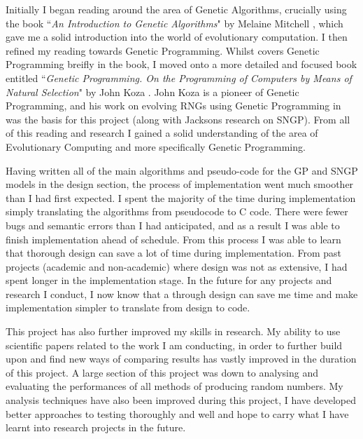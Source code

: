 \documentclass[a4paper,10.5pt]{article}
\begin{document}
Initially I began reading around the area of Genetic Algorithms, crucially using the book ``\emph{An Introduction to Genetic Algorithms}" by Melaine Mitchell \cite{mitchell}, which gave me a solid introduction into the world of evolutionary computation. I then refined my reading towards Genetic Programming. Whilst \cite{mitchell} covers Genetic Programming breifly in the book, I moved onto a more detailed and focused book entitled ``\emph{Genetic Programming. On the Programming of Computers by Means of Natural Selection}" by John Koza \cite{kozagpbook}. John Koza is a pioneer of Genetic Programming, and his work on evolving RNGs using Genetic Programming in \cite{kozarng} was the basis for this project (along with Jacksons research on SNGP). From all of this reading and research I gained a solid understanding of the area of Evolutionary Computing and more specifically Genetic Programming.

Having written all of the main algorithms and pseudo-code for the GP and SNGP models in the design section, the process of implementation went much smoother than I had first expected. I spent the majority of the time during implementation simply translating the algorithms from pseudocode to C code. There were fewer bugs and semantic errors than I had anticipated, and as a result I was able to finish implementation ahead of schedule. From this process I was able to learn that thorough design can save a lot of time during implementation. From past projects (academic and non-academic) where design was not as extensive, I had spent longer in the implementation stage. In the future for any projects and research I conduct, I now know that a through design can save me time and make implementation simpler to translate from design to code.

This project has also further improved my skills in research. My ability to use scientific papers related to the work I am conducting, in order to further build upon and find new ways of comparing results has vastly improved in the duration of this project. A large section of this project was down to analysing and evaluating the performances of all methods of producing random numbers. My analysis techniques have also been improved during this project, I have developed better approaches to testing thoroughly and well and hope to carry what I have learnt into research projects in the future. 
\end{document}
